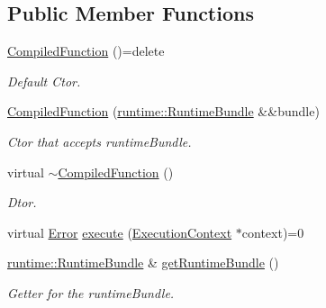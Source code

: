 \subsection*{Public Member Functions}
\begin{DoxyCompactItemize}
\item 
\mbox{\label{classglow_1_1_compiled_function_ac90cbf592a8f1747fd6f830619cc1bd7}} 
\hyperlink{classglow_1_1_compiled_function_ac90cbf592a8f1747fd6f830619cc1bd7}{Compiled\+Function} ()=delete
\begin{DoxyCompactList}\small\item\em Default Ctor. \end{DoxyCompactList}\item 
\mbox{\label{classglow_1_1_compiled_function_aefb744fb4f880df757a3166ea0987dbb}} 
\hyperlink{classglow_1_1_compiled_function_aefb744fb4f880df757a3166ea0987dbb}{Compiled\+Function} (\hyperlink{classglow_1_1runtime_1_1_runtime_bundle}{runtime\+::\+Runtime\+Bundle} \&\&bundle)
\begin{DoxyCompactList}\small\item\em Ctor that accepts runtime\+Bundle. \end{DoxyCompactList}\item 
\mbox{\label{classglow_1_1_compiled_function_a775a5757f4cb0afce2a971bab92a4408}} 
virtual \hyperlink{classglow_1_1_compiled_function_a775a5757f4cb0afce2a971bab92a4408}{$\sim$\+Compiled\+Function} ()
\begin{DoxyCompactList}\small\item\em Dtor. \end{DoxyCompactList}\item 
virtual \hyperlink{namespaceglow_afdb176c3a672ef66db0ecfc19a8d39bf}{Error} \hyperlink{classglow_1_1_compiled_function_ac8dd94f2ee7129a435f1701b6a9f419e}{execute} (\hyperlink{classglow_1_1_execution_context}{Execution\+Context} $\ast$context)=0
\item 
\mbox{\label{classglow_1_1_compiled_function_a8b4bcab9e0aebcc271db2cef40bd5e3c}} 
\hyperlink{classglow_1_1runtime_1_1_runtime_bundle}{runtime\+::\+Runtime\+Bundle} \& \hyperlink{classglow_1_1_compiled_function_a8b4bcab9e0aebcc271db2cef40bd5e3c}{get\+Runtime\+Bundle} ()
\begin{DoxyCompactList}\small\item\em Getter for the runtime\+Bundle. \end{DoxyCompactList}\item 

\end{DoxyCompactItemize}
